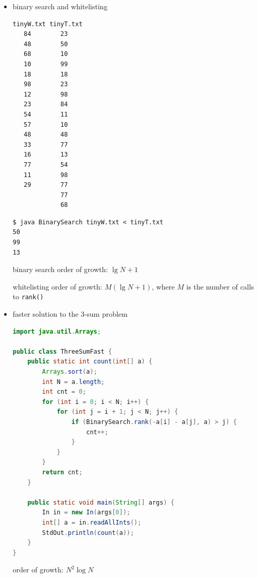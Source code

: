 \documentclass[8pt,a4paper,compress]{beamer}
\begin{document}
\begin{frame}[fragile]
\begin{itemize}
\item binary search and whitelisting
\begin{lstlisting}[language={}]
tinyW.txt tinyT.txt
   84        23
   48        50
   68        10
   10        99
   18        18
   98        23
   12        98
   23        84
   54        11
   57        10
   48        48
   33        77
   16        13
   77        54
   11        98
   29        77
             77
             68
\end{lstlisting}

\begin{lstlisting}[language={}]
$ java BinarySearch tinyW.txt < tinyT.txt
50
99
13
\end{lstlisting}

binary search order of growth: $\lg N + 1$ 

whitelisting order of growth: $M(\lg N + 1)$, where $M$ is the number of calls to \lstinline{rank()}
\end{itemize}
\end{frame}

\begin{frame}[fragile]
\begin{itemize}
\item faster solution to the 3-sum problem
\begin{lstlisting}[language=Java]
import java.util.Arrays;

public class ThreeSumFast {
    public static int count(int[] a) {
        Arrays.sort(a);
        int N = a.length;
        int cnt = 0;
        for (int i = 0; i < N; i++) {
            for (int j = i + 1; j < N; j++) {
                if (BinarySearch.rank(-a[i] - a[j], a) > j) {
                    cnt++;
                }
            }
        }
        return cnt;
    }
    
    public static void main(String[] args) {
        In in = new In(args[0]);
        int[] a = in.readAllInts();
        StdOut.println(count(a));
    }
}
\end{lstlisting}

order of growth: $N^2\log N$
\end{itemize}
\end{frame}
\end{document}
